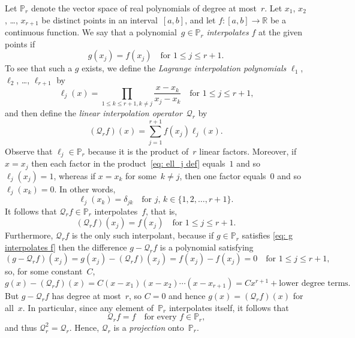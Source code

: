 Let $\mathbb{P}_r$ denote the vector space of real polynomials of degree at 
most~$r$.  Let $x_1$, $x_2$, \dots, $x_{r+1}$ be distinct points in an 
interval~$[a,b]$, and let $f:[a,b]\to\mathbb{R}$ be a continuous function.  We 
say that a polynomial~$g\in\mathbb{P}_r$ \emph{interpolates} $f$ at the given 
points if
\begin{equation}\label{eq: g interpolates f}
g(x_j)=f(x_j)\quad\text{for $1\le j\le r+1$.}
\end{equation}
To see that such a $g$ exists, we define the \emph{Lagrange 
interpolation polynomials} $\ell_1$, $\ell_2$, \dots, $\ell_{r+1}$ by
\begin{equation}\label{eq: ell_j def}
\ell_j(x)=\prod_{1\le k\le r+1, k\ne j}
	\frac{x-x_k}{x_j-x_k}\quad\text{for $1\le j\le r+1$,}
\end{equation}
and then define the \emph{linear interpolation operator}~$\mathcal{Q}_r$ by
\[
(\mathcal{Q}_rf)(x)=\sum_{j=1}^{r+1}f(x_j)\ell_j(x).
\]
Observe that $\ell_j\in\mathbb{P}_r$ because it is the product of~$r$ linear 
factors.  Moreover, if $x=x_j$ then each factor in the 
product~\eqref{eq: ell_j def} equals~$1$ and so $\ell_j(x_j)=1$, whereas if 
$x=x_k$ for some~$k\ne j$, then one factor equals~$0$ and so $\ell_j(x_k)=0$.
In other words,
\[
\ell_j(x_k)=\delta_{jk}\quad\text{for $j$, $k\in\{1,2,\ldots,r+1\}$.}
\]
It follows that $\mathcal{Q}_rf\in\mathbb{P}_r$ interpolates~$f$, that is,
\[
(\mathcal{Q}_rf)(x_j)=f(x_j)\quad\text{for $1\le j\le r+1$.}
\]
Furthermore, $\mathcal{Q}_rf$ is the only such interpolant, because if 
$g\in\mathbb{P}_r$ satisfies \eqref{eq: g interpolates f} then the difference
$g-\mathcal{Q}_rf$ is a polynomial satisfying
\[
(g-\mathcal{Q}_rf)(x_j)=g(x_j)-(\mathcal{Q}_rf)(x_j)=f(x_j)-f(x_j)=0
	\quad\text{for $1\le j\le r+1$,}
\]
so, for some constant~$C$,
\[
g(x)-(\mathcal{Q}_rf)(x)=C(x-x_1)(x-x_2)\cdots(x-x_{r+1}) 
	=Cx^{r+1}+\text{lower degree terms}.
\]
But $g-\mathcal{Q}_rf$ has degree at most~$r$, so $C=0$ and hence
$g(x)=(\mathcal{Q}_rf)(x)$ for all~$x$. In particular, since any element 
of~$\mathbb{P}_r$ interpolates itself, it follows that
\[
\mathcal{Q}_rf=f\quad\text{for every $f\in\mathbb{P}_r$,}
\]
and thus $\mathcal{Q}_r^2=\mathcal{Q}_r$.  Hence, $\mathcal{Q}_r$ is a 
\emph{projection} onto~$\mathbb{P}_r$.

